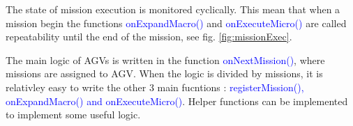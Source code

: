 The state of mission execution is monitored cyclically. This mean that when a mission begin the functions \textcolor{blue}{onExpandMacro()} and \textcolor{blue}{onExecuteMicro()} are called repeatability until the end of the mission, see fig. \ref{fig:missionExec}.

The main logic of AGVs is written in the function \textcolor{blue}{onNextMission()}, where missions are assigned to AGV. When the logic is divided by missions, it is relativley easy to write the other 3 main fucntions : \textcolor{blue}{ registerMission(), onExpandMacro() and onExecuteMicro()}. Helper functions can be implemented to implement some useful logic.